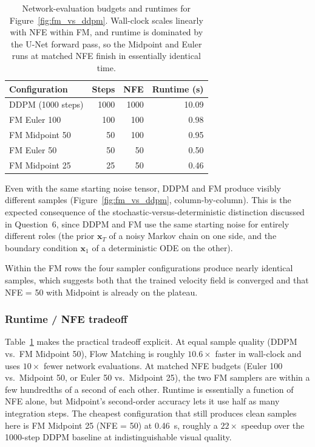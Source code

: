 \documentclass{article}
\begin{document}
\begin{table}[H]
  \centering
  \caption{Network-evaluation budgets and runtimes for
           Figure~\ref{fig:fm_vs_ddpm}. Wall-clock scales linearly with NFE
           within FM, and runtime is dominated by the U-Net forward pass, so
           the Midpoint and Euler runs at matched NFE finish in essentially
           identical time.}
  \label{tab:fm_runtime}
  \begin{tabular}{lrrr}
    \toprule
    Configuration       & Steps & NFE   & Runtime (s) \\
    \midrule
    DDPM (1000 steps)   & 1000  & 1000  & 10.09 \\
    FM Euler 100        &  100  &  100  &  0.98 \\
    FM Midpoint 50      &   50  &  100  &  0.95 \\
    FM Euler 50         &   50  &   50  &  0.50 \\
    FM Midpoint 25      &   25  &   50  &  0.46 \\
    \bottomrule
  \end{tabular}
\end{table}

Even with the same starting noise tensor, DDPM and FM produce visibly different
samples (Figure~\ref{fig:fm_vs_ddpm}, column-by-column). This is the expected
consequence of the stochastic-versus-deterministic distinction discussed in
Question~6, since DDPM and FM use the same starting noise for entirely
different roles (the prior $\mathbf{x}_T$ of a noisy Markov chain on one side,
and the boundary condition $\mathbf{x}_1$ of a deterministic ODE on the other).

Within the FM rows the four sampler configurations produce nearly identical
samples, which suggests both that the trained velocity field is converged and
that NFE = 50 with Midpoint is already on the plateau.

\subsubsection*{Runtime / NFE tradeoff}

Table~\ref{tab:fm_runtime} makes the practical tradeoff explicit. At equal
sample quality (DDPM vs.\ FM Midpoint 50), Flow Matching is roughly
$10.6\times$ faster in wall-clock and uses $10\times$ fewer network evaluations.
At matched NFE budgets (Euler 100 vs.\ Midpoint 50, or Euler 50 vs.\ Midpoint
25), the two FM samplers are within a few hundredths of a second of each other.
Runtime is essentially a function of NFE alone, but Midpoint's second-order
accuracy lets it use half as many integration steps. The cheapest configuration
that still produces clean samples here is FM Midpoint 25 (NFE = 50) at 0.46~s,
roughly a $22\times$ speedup over the 1000-step DDPM baseline at
indistinguishable visual quality.
\end{document}
